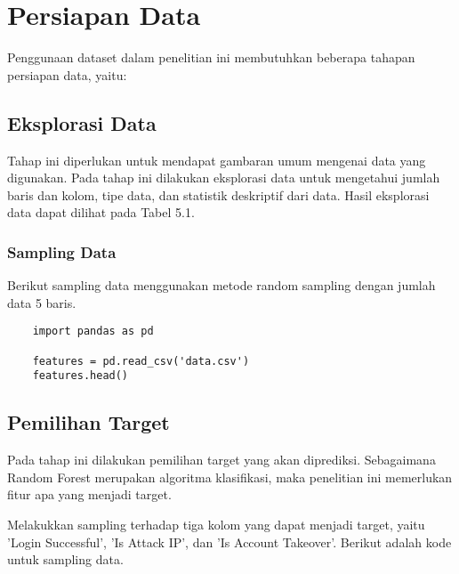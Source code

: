 \section{Persiapan Data}
Penggunaan dataset dalam penelitian ini membutuhkan beberapa tahapan persiapan data, yaitu:

\subsection{Eksplorasi Data}
Tahap ini diperlukan untuk mendapat gambaran umum mengenai data yang digunakan. Pada tahap ini dilakukan eksplorasi data untuk mengetahui jumlah baris dan kolom, tipe data, dan statistik deskriptif dari data. Hasil eksplorasi data dapat dilihat pada Tabel 5.1.

\subsubsection{Sampling Data}
Berikut sampling data menggunakan metode random sampling dengan jumlah data 5 baris.

\begin{lstlisting}
    import pandas as pd
    
    features = pd.read_csv('data.csv')
    features.head()
    \end{lstlisting}

\subsection{Pemilihan Target}
Pada tahap ini dilakukan pemilihan target yang akan diprediksi. Sebagaimana Random Forest merupakan algoritma klasifikasi, maka penelitian ini memerlukan fitur apa yang menjadi target.

Melakukkan sampling terhadap tiga kolom yang dapat menjadi target, yaitu 'Login Successful', 'Is Attack IP', dan 'Is Account Takeover'. Berikut adalah kode untuk sampling data.

